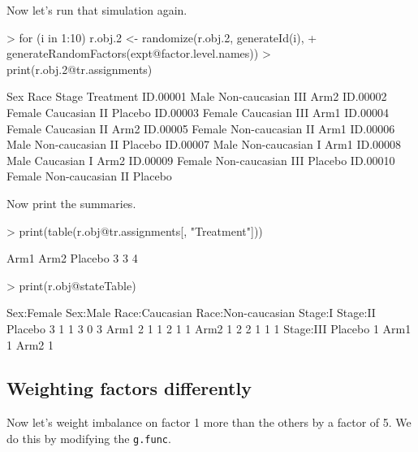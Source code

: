 \documentclass[11pt, letter]{article}
\numberwithin{equation}{section}
\begin{document}
Now let's run that simulation again.
\begin{Schunk}
\begin{Sinput}
> for (i in 1:10) r.obj.2 <- randomize(r.obj.2, generateId(i), 
+     generateRandomFactors(expt@factor.level.names))
> print(r.obj.2@tr.assignments)
\end{Sinput}
\begin{Soutput}
            Sex          Race Stage Treatment
ID.00001   Male Non-caucasian   III      Arm2
ID.00002 Female     Caucasian    II   Placebo
ID.00003 Female     Caucasian   III      Arm1
ID.00004 Female     Caucasian    II      Arm2
ID.00005 Female Non-caucasian    II      Arm1
ID.00006   Male Non-caucasian    II   Placebo
ID.00007   Male Non-caucasian     I      Arm1
ID.00008   Male     Caucasian     I      Arm2
ID.00009 Female Non-caucasian   III   Placebo
ID.00010 Female Non-caucasian    II   Placebo
\end{Soutput}
\end{Schunk}

Now print the summaries.

\begin{Schunk}
\begin{Sinput}
> print(table(r.obj@tr.assignments[, "Treatment"]))
\end{Sinput}
\begin{Soutput}
   Arm1    Arm2 Placebo 
      3       3       4 
\end{Soutput}
\begin{Sinput}
> print(r.obj@stateTable)
\end{Sinput}
\begin{Soutput}
        Sex:Female Sex:Male Race:Caucasian Race:Non-caucasian Stage:I Stage:II
Placebo          3        1              1                  3       0        3
Arm1             2        1              1                  2       1        1
Arm2             1        2              2                  1       1        1
        Stage:III
Placebo         1
Arm1            1
Arm2            1
\end{Soutput}
\end{Schunk}

\subsection{Weighting factors differently}
\label{sec:weight-factors}

Now let's weight imbalance on factor 1 more than the others by a
factor of 5. We do this by modifying the \texttt{g.func}.
\end{document}
